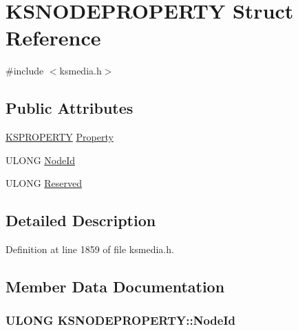 \hypertarget{struct_k_s_n_o_d_e_p_r_o_p_e_r_t_y}{}\section{K\+S\+N\+O\+D\+E\+P\+R\+O\+P\+E\+R\+TY Struct Reference}
\label{struct_k_s_n_o_d_e_p_r_o_p_e_r_t_y}


{\ttfamily \#include $<$ksmedia.\+h$>$}

\subsection*{Public Attributes}
\begin{DoxyCompactItemize}
\item 
\hyperlink{ks_8h_a4392f77c74e868d813d46c39ada4d660}{K\+S\+P\+R\+O\+P\+E\+R\+TY} \hyperlink{struct_k_s_n_o_d_e_p_r_o_p_e_r_t_y_a26945962aee6c686cd0c6963c3a157b4}{Property}
\item 
U\+L\+O\+NG \hyperlink{struct_k_s_n_o_d_e_p_r_o_p_e_r_t_y_a1d726bf8fc108f42eac69b2e700a4a5e}{Node\+Id}
\item 
U\+L\+O\+NG \hyperlink{struct_k_s_n_o_d_e_p_r_o_p_e_r_t_y_aa4e8e25e0bebd3dfcb0d4a79524e33fd}{Reserved}
\end{DoxyCompactItemize}


\subsection{Detailed Description}


Definition at line 1859 of file ksmedia.\+h.



\subsection{Member Data Documentation}
\subsubsection[{\texorpdfstring{Node\+Id}{NodeId}}]{\setlength{\rightskip}{0pt plus 5cm}U\+L\+O\+NG K\+S\+N\+O\+D\+E\+P\+R\+O\+P\+E\+R\+T\+Y\+::\+Node\+Id}\hypertarget{struct_k_s_n_o_d_e_p_r_o_p_e_r_t_y_a1d726bf8fc108f42eac69b2e700a4a5e}{}\label{struct_k_s_n_o_d_e_p_r_o_p_e_r_t_y_a1d726bf8fc108f42eac69b2e700a4a5e}


